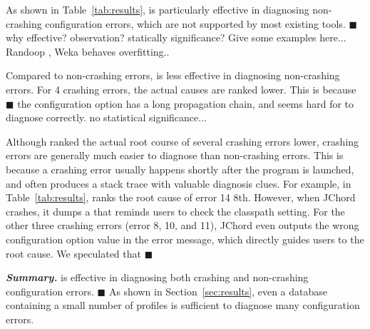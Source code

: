 As shown in Table~\ref{tab:results}, \ourtool is particularly effective
in diagnosing non-crashing configuration errors, which are not supported
by most existing tools. $\blacksquare$ why effective? observation?
statically significance? Give some examples here... Randoop ,
Weka behaves overfitting..


Compared to non-crashing errors, \ourtool is less effective
in diagnosing non-crashing errors. For 4 crashing errors,
the actual causes are ranked lower.
This is because $\blacksquare$ the configuration option has
a long propagation chain, and seems hard for \ourtool
to diagnose correctly. no statistical significance...

Although \ourtool ranked the actual root course of several
crashing errors lower, crashing errors are generally much easier to diagnose than non-crashing errors.
This is because a crashing error usually happens shortly after the program
is launched, and often produces a stack trace with valuable diagnosis clues.
For example, in Table~\ref{tab:results}, \ourtool ranks the root cause of
error 14  8th.
However, when JChord crashes, it dumps a 
that reminds users to check the classpath setting. For the other three crashing errors (error 8, 10, and 11),
JChord even outputs the wrong configuration option value in the
error message, which
directly guides users to the root cause. We speculated that $\blacksquare$








\vspace{1mm}
\noindent \textbf{\textit{Summary.}} \ourtool is effective
in diagnosing both crashing and non-crashing configuration errors. $\blacksquare$
As shown
in Section~\ref{sec:results}, even a database containing
a small number of profiles is sufficient to
diagnose many configuration errors.


